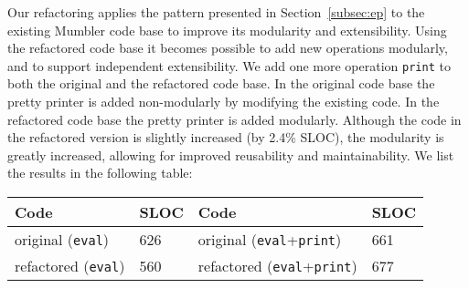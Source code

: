 Our refactoring applies the pattern presented in
Section~\ref{subsec:ep} to the existing Mumbler code base to improve
its modularity and extensibility. Using the refactored code base it
becomes possible to add new operations modularly, and to support
independent extensibility. We add one more
operation \texttt{print} to both the original and the refactored code
base. In the original code base the pretty printer is added
non-modularly by modifying the existing code. In the refactored code
base the pretty printer is added modularly. 
Although the code in the refactored version is slightly increased (by 2.4\% SLOC), the
modularity is greatly increased, allowing for improved reusability and maintainability.
We list the results in the following table:

\vspace{0.5em}
{\small
\begin{tabular}{llll}
\hline
\rowcolor[HTML]{C0C0C0} 
Code               & SLOC & Code               & SLOC \\ \hline
original (\texttt{eval})         & 626  & original (\texttt{eval}+\texttt{print}) & 661  \\ 
refactored (\texttt{eval})         & 560  & refactored (\texttt{eval}+\texttt{print}) & 677  \\ \hline
\end{tabular}
}

